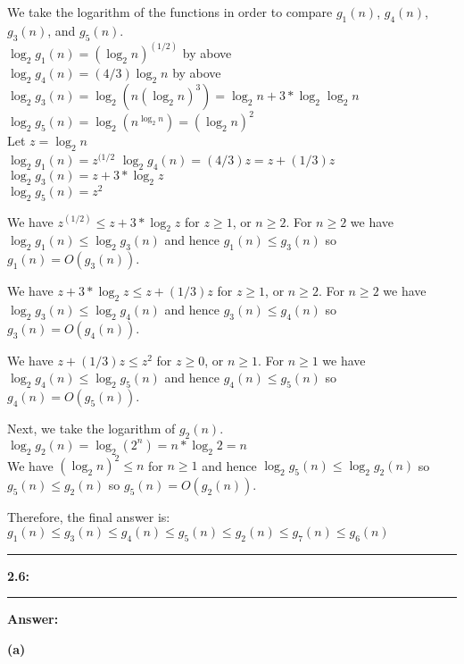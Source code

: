 \documentclass[11pt]{article}
\newcommand\question[2]{\vspace{.25in}\hrule\textbf{#1: #2}\vspace{.5em}\hrule\vspace{.10in}}
\renewcommand\part[1]{\vspace{.10in}\textbf{(#1)}}
\newcommand\answer{\vspace{.10in}\textbf{Answer: }}
\begin{document}
We take the logarithm of the functions in order to compare $g_1(n)$, $g_4(n)$, $g_3(n)$, and $g_5(n)$.\\

$\log_{2}g_1(n) = (\log_{2}n)^{(1/2)}$ by above\\
$\log_{2}g_4(n) = (4/3)\log_{2}n$ by above\\
$\log_{2}g_3(n) = \log_{2}(n(\log_{2}n)^3) = \log_{2}n + 3 * \log_{2}\log_{2}n$\\
$\log_{2}g_5(n) = \log_{2}(n^{\log_{2}n}) = (\log_{2}n)^2$\\
Let $z = \log_{2}n$\\
$\log_{2}g_1(n) = z^{(1/2}$
$\log_{2}g_4(n) = (4/3)z = z + (1/3)z$\\
$\log_{2}g_3(n) = z + 3 * \log_{2}z$\\
$\log_{2}g_5(n) = z^2$\newline

We have $z^{(1/2)} \leq z + 3 * \log_{2}z$ for $z \geq 1$, or $n \geq 2$. For $n \geq 2$ we have $\log_{2}g_1(n) \leq \log_{2}g_3(n)$ and hence $g_1(n) \leq g_3(n)$ so $g_1(n) = O(g_3(n))$.\newline

We have $z + 3 * \log_{2}z \leq z + (1/3)z$ for $z \geq 1$, or $n \geq 2$. For $n \geq 2$ we have $\log_{2}g_3(n) \leq \log_{2}g_4(n)$ and hence $g_3(n) \leq g_4(n)$ so $g_3(n) = O(g_4(n))$.\newline

We have $z + (1/3)z \leq z^2$ for $z \geq 0$, or $n \geq 1$. For $n \geq 1$ we have $\log_{2}g_4(n) \leq \log_{2}g_5(n)$ and hence $g_4(n) \leq g_5(n)$ so $g_4(n) = O(g_5(n))$.\newline

Next, we take the logarithm of $g_2(n)$.\\
$\log_{2}g_2(n) = \log_{2}(2^n) = n * \log_{2}2 = n$\\
We have $(\log_{2}n)^2 \leq n$ for $n \geq 1$ and hence $\log_{2}g_5(n) \leq \log_{2}g_2(n)$ so $g_5(n) \leq g_2(n)$ so $g_5(n) = O(g_2(n))$.\newline

Therefore, the final answer is:\\
$g_1(n) \leq g_3(n) \leq g_4(n) \leq g_5(n) \leq g_2(n) \leq g_7(n) \leq g_6(n)$


\clearpage

\question{2.6}{}

\answer

\part{a}
\end{document}
